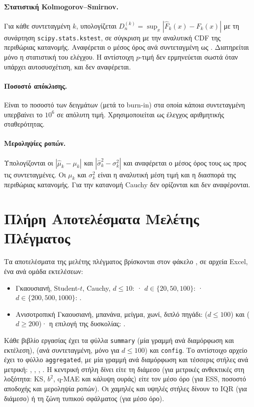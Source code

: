 \paragraph{Στατιστική Kolmogorov--Smirnov.}
Για κάθε συντεταγμένη $k$, υπολογίζεται
$D_n^{(k)} = \sup_x |\hat F_k(x) - F_k(x)|$ με τη συνάρτηση
\texttt{scipy.stats.kstest}, σε σύγκριση με την αναλυτική CDF της περιθώριας κατανομής.
Αναφέρεται ο μέσος όρος ανά συντεταγμένη ως .
Διατηρείται μόνο η στατιστική του ελέγχου. Η αντίστοιχη $p$-τιμή δεν ερμηνεύεται
σωστά όταν υπάρχει αυτοσυσχέτιση, και δεν αναφέρεται.

\paragraph{Ποσοστό απόκλισης.}
Είναι το ποσοστό των δειγμάτων (μετά το burn-in) στα οποία κάποια συντεταγμένη
υπερβαίνει το $10^6$ σε απόλυτη τιμή. Χρησιμοποιείται ως έλεγχος αριθμητικής
σταθερότητας.

\paragraph{Μεροληψίες ροπών.}
Υπολογίζονται οι $\left|\hat\mu_k - \mu_k\right|$ και $\left|\hat\sigma_k^2 -
\sigma_k^2\right|$ και αναφέρεται ο μέσος όρος τους ως προς τις συντεταγμένες. Οι
$\mu_k$ και $\sigma_k^2$ είναι η αναλυτική μέση τιμή και η διασπορά της περιθώριας
κατανομής. Για την κατανομή Cauchy δεν ορίζονται και δεν αναφέρονται.

\section{Πλήρη Αποτελέσματα Μελέτης Πλέγματος}
\label{sec:app-results-table}

Τα αποτελέσματα της μελέτης πλέγματος βρίσκονται στον φάκελο ,
σε αρχεία Excel, ένα ανά ομάδα εκτελέσεων:
\begin{itemize}
\item Γκαουσιανή, Student-$t$, Cauchy, $d \le 10$:
      ·
      $d \in \{20, 50, 100\}$:
      ·
      $d \in \{200, 500, 1000\}$: .
\item Ανισοτροπική Γκαουσιανή, μπανάνα, μείγμα, χωνί, διπλό πηγάδι: 
      ($d \le 100$) και  ($d \ge 200$)· η επιλογή της
      δυσκολίας: .
\end{itemize}
Κάθε βιβλίο εργασίας έχει τα φύλλα \texttt{summary} (μία γραμμή ανά διαμόρφωση και
εκτέλεση),  (ανά συντεταγμένη, μόνο για $d \le 100$) και
\texttt{config}. Το αντίστοιχο αρχείο  έχει το φύλλο
\texttt{aggregated}, με μία γραμμή ανά διαμόρφωση και τέσσερις στήλες ανά μετρική:
, , ,
. Η κεντρική στήλη δίνει είτε τη διάμεσο (για μετρικές
ανθεκτικές στη λοξότητα: KS, $b^2$, q-MAE και κάλυψη ουράς) είτε τον μέσο όρο
(για ESS, ποσοστό αποδοχής και μεροληψία ροπών). Οι χαμηλές και υψηλές στήλες
δίνουν το IQR (για διάμεσο) ή τη ζώνη τυπικού σφάλματος (για μέσο όρο).

